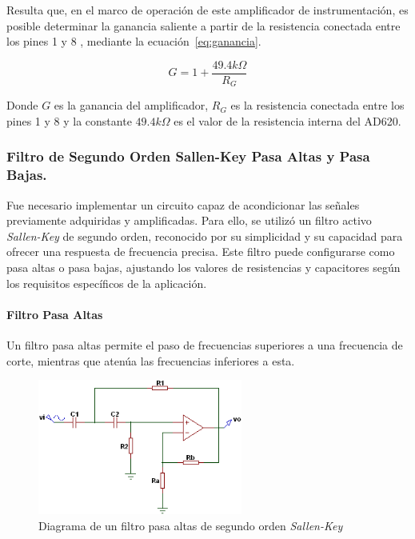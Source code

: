             Resulta que, en el marco de operación de este amplificador de instrumentación, es posible determinar la ganancia saliente a partir de la resistencia conectada entre los pines 1 y 8 \cite{AD620_AnalogDevices}, mediante la ecuación~\ref{eq:ganancia}.

            \begin{equation}
                \label{eq:ganancia}
                G = 1 + \frac{49.4 k\Omega}{R_G}
            \end{equation}

            Donde $G$ es la ganancia del amplificador, $R_G$ es la resistencia conectada entre los pines 1 y 8 y la constante $49.4 k\Omega$ es el valor de la resistencia interna del AD620.


        \subsubsection{Filtro de Segundo Orden Sallen-Key Pasa Altas y Pasa Bajas.}
            Fue necesario implementar un circuito capaz de acondicionar las señales previamente adquiridas y amplificadas. Para ello, se utilizó un filtro activo \textit{Sallen-Key} de segundo orden, reconocido por su simplicidad y su capacidad para ofrecer una respuesta de frecuencia precisa. Este filtro puede configurarse como pasa altas o pasa bajas, ajustando los valores de resistencias y capacitores según los requisitos específicos de la aplicación.

            \paragraph{Filtro Pasa Altas}
                Un filtro pasa altas permite el paso de frecuencias superiores a una frecuencia de corte, mientras que atenúa las frecuencias inferiores a esta.

                \begin{figure}[H]
                    \centering
                    \includegraphics[width=0.6\textwidth]{img/Desarrollo/Filtro_Pasa_Altas.png}
                    \caption[Diagrama de un filtro pasa altas de segundo orden \textit{Sallen-Key}.]{Diagrama de un filtro pasa altas de segundo orden \textit{Sallen-Key}\footnotemark}
                    \label{fig:Filtro_Pasa_Altas}
                \end{figure}


